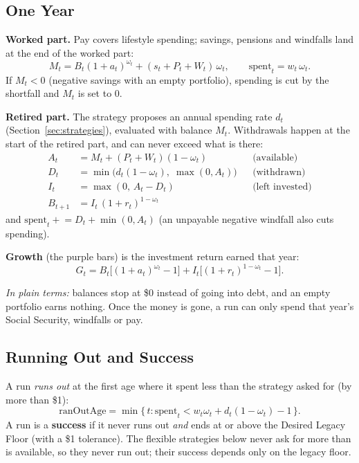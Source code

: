 \documentclass[11pt,letterpaper]{article}
\newcommand{\plain}[1]{\par\smallskip\noindent\textcolor{mpgrey}{\textit{In plain terms:} #1}\par\smallskip}
\begin{document}
\subsection{One Year}

\textbf{Worked part.} Pay covers lifestyle spending; savings, pensions and windfalls land at the end of the worked part:
\begin{equation}
M_t = B_t(1+a_t)^{\omega_t} + (s_t + P_t + W_t)\,\omega_t, \qquad \text{spent}_t = w_t\,\omega_t .
\end{equation}
If $M_t<0$ (negative savings with an empty portfolio), spending is cut by the shortfall and $M_t$ is set to 0.

\textbf{Retired part.} The strategy proposes an annual spending rate $d_t$ (Section~\ref{sec:strategies}), evaluated with balance $M_t$. Withdrawals happen at the start of the retired part, and can never exceed what is there:
\begin{align}
A_t &= M_t + (P_t + W_t)(1-\omega_t) && \text{(available)}\\
D_t &= \min\!\big(d_t(1-\omega_t),\; \max(0, A_t)\big) && \text{(withdrawn)}\\
I_t &= \max(0,\, A_t - D_t) && \text{(left invested)}\\
B_{t+1} &= I_t\,(1+r_t)^{1-\omega_t}
\end{align}
and $\text{spent}_t \mathrel{+}= D_t + \min(0, A_t)$ (an unpayable negative windfall also cuts spending).

\textbf{Growth} (the purple bars) is the investment return earned that year:
\begin{equation}
G_t = B_t\big[(1+a_t)^{\omega_t}-1\big] + I_t\big[(1+r_t)^{1-\omega_t}-1\big].
\end{equation}

\plain{balances stop at \$0 instead of going into debt, and an empty portfolio earns nothing. Once the money is gone, a run can only spend that year's Social Security, windfalls or pay.}

\subsection{Running Out and Success}

A run \emph{runs out} at the first age where it spent less than the strategy asked for (by more than \$1):
\begin{equation}
\text{ranOutAge} = \min\{\,t : \text{spent}_t < w_t\omega_t + d_t(1-\omega_t) - 1\,\}.
\end{equation}
A run is a \textbf{success} if it never runs out \emph{and} ends at or above the Desired Legacy Floor (with a \$1 tolerance). The flexible strategies below never ask for more than is available, so they never run out; their success depends only on the legacy floor.
\end{document}
